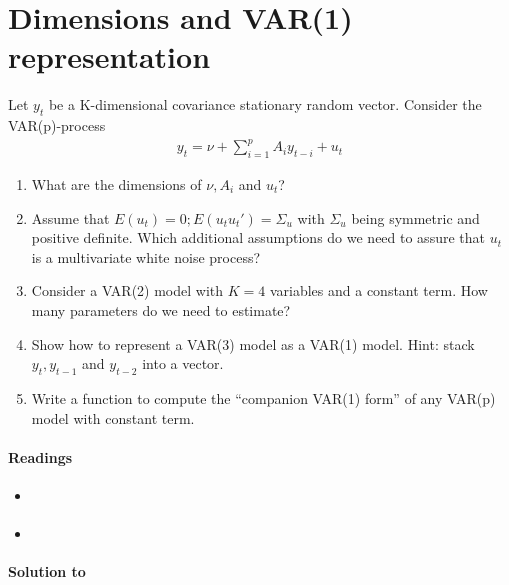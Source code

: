 \section[Dimensions and VAR(1) representation]{Dimensions and VAR(1) representation\label{ex:DimensionsAndVAROneRepresentation}}
Let \(y_t\) be a K-dimensional covariance stationary random vector.
Consider the VAR(p)-process
\begin{align*}
y_t = \nu + \sum_{i=1}^p A_i {y_{t-i}} + u_t
\end{align*}
\begin{enumerate}
\item What are the dimensions of \(\nu, A_i\) and \(u_{t}\)?

\item Assume that \(E(u_t) = 0; E(u_t u_t') = \Sigma_u\) with \(\Sigma_u\) being symmetric and positive definite.
Which additional assumptions do we need to assure that \(u_t\) is a multivariate white noise process?	

\item Consider a VAR(2) model with \(K=4\) variables and a constant term.
How many parameters do we need to estimate?

\item Show how to represent a VAR(3) model as a VAR(1) model. Hint: stack \(y_t, y_{t-1}\) and \(y_{t-2}\) into a vector.

\item Write a function to compute the \enquote{companion VAR(1) form} of any VAR(p) model with constant term.
\end{enumerate}

\paragraph{Readings}
\begin{itemize}
	\item \textcite[Ch.~2.2]{Kilian.Lutkepohl_2017_StructuralVectorAutoregressive}
	\item \textcite[Ch.~2]{Lutkepohl_2005_NewIntroductionMultiple}
\end{itemize}

\begin{solution}\textbf{Solution to }
\ifDisplaySolutions

\fi
\newpage
\end{solution}
